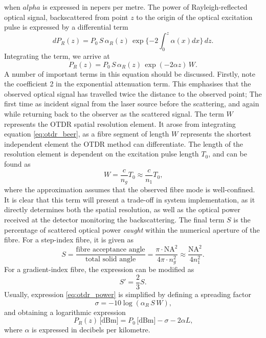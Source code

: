 \documentclass{standalone}
\begin{document}
when $alpha$ is expressed in nepers per metre. The power of Rayleigh-reflected optical signal, backscattered from point $z$ to the origin of the optical excitation pulse is expressed by a differential term
\begin{equation} \label{eq:otdr_beer}
dP_R(z) = P_0 \, S \, \alpha_R(z) \, \exp\{ -2 \int_{0}^{z} \alpha(x) dx \} \, dz \textrm{.}
\end{equation}
Integrating the term, we arrive at
\begin{equation} \label{eq:otdr_power}
P_R(z) = P_0 \, S \, \alpha_R(z) \, \exp\left(-2 \alpha z\right) \, W \textrm{.}
\end{equation}
A number of important terms in this equation should be discussed. Firstly, note the coefficient 2 in the exponential attenuation term. This emphasises that the observed optical signal has travelled twice the distance to the observed point; The first time as incident signal from the laser source before the scattering, and again while returning back to the observer as the scattered signal. The term $W$ represents the OTDR spatial resolution element. It arose from integrating equation \ref{eq:otdr_beer}, as a fibre segment of length $W$ represents the shortest independent element the OTDR method can differentiate. The length of the resolution element is dependent on the excitation pulse length $T_0$, and can be found as
\begin{equation} \label{eq:otdr_resolution}
W = \frac{c}{n_g} T_0 \approx \frac{c}{n_1} T_0 \textrm{,}
\end{equation}
where the approximation assumes that the observed fibre mode is well-confined. It is clear that this term will present a trade-off in system implementation, as it directly determines both the spatial resolution, as well as the optical power received at the detector monitoring the backscattering. The final term $S$ is the percentage of scattered optical power \textit{caught} within the numerical aperture of the fibre. For a step-index fibre, it is given as
\begin{equation}
S = \frac{\textrm{fibre acceptance angle}}{\textrm{total solid angle}} = \frac{\pi \cdot \textrm{NA}^2}{4 \pi \cdot n_g^2} \approx \frac{\textrm{NA}^2}{4n_1^2} \textrm{.}
\end{equation}
For a gradient-index fibre, the expression can be modified as
\begin{equation}
S' = \frac{2}{3} S \textrm{.}
\end{equation}
Usually, expression \ref{eq:otdr_power} is simplified by defining a spreading factor
\begin{equation}
\sigma = -10 \log \left( \alpha_R \, S \, W \right) \textrm{,}
\end{equation}
and obtaining a logarithmic expression
\begin{equation}
P_R(z) \,\textrm{[dBm]} = P_0 \,\textrm{[dBm]} - \sigma - 2\alpha L \textrm{,}
\end{equation}
where $\alpha$ is expressed in decibels per kilometre. \\
\end{document}
